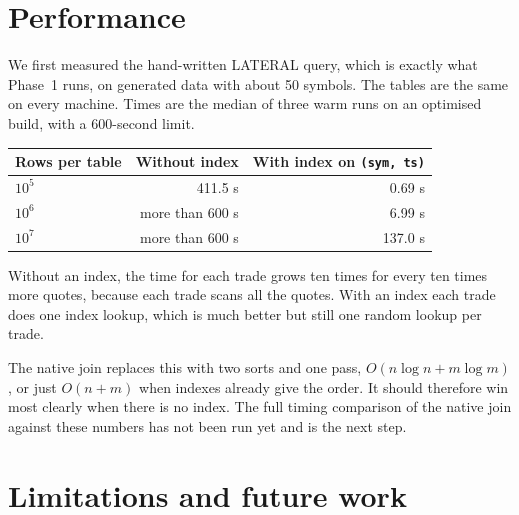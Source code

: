 \documentclass[11pt,a4paper]{article}
\newcommand{\code}[1]{\texttt{#1}}
\begin{document}
\section{Performance}
\label{sec:bench}

We first measured the hand-written LATERAL query, which is exactly what Phase~1 runs, on
generated data with about 50 symbols. The tables are the same on every machine. Times are
the median of three warm runs on an optimised build, with a 600-second limit.

\begin{center}
\begin{tabular}{@{}lrr@{}}
\toprule
Rows per table & Without index & With index on \code{(sym, ts)} \\
\midrule
$10^5$ & 411.5 s & 0.69 s \\
$10^6$ & more than 600 s & 6.99 s \\
$10^7$ & more than 600 s & 137.0 s \\
\bottomrule
\end{tabular}
\end{center}

Without an index, the time for each trade grows ten times for every ten times more
quotes, because each trade scans all the quotes. With an index each trade does one index
lookup, which is much better but still one random lookup per trade.

The native join replaces this with two sorts and one pass, $O(n \log n + m \log m)$, or
just $O(n + m)$ when indexes already give the order. It should therefore win most clearly
when there is no index. The full timing comparison of the native join against these
numbers has not been run yet and is the next step.

\section{Limitations and future work}
\label{sec:limits}
\end{document}
